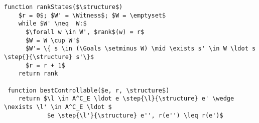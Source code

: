 \begin{lstlisting}[language={pseudocode},label={lst:dcs.aux},caption={ranking procedures.},float=ht, frame=single]
 function rankStates($\structure$)
    $r = 0$; $W' = \Witness$; $W = \emptyset$
    while $W' \neq  W:$
      $\forall w \in W', $rank$(w) = r$
      $W = W \cup W'$
      $W'= \{ s \in (\Goals \setminus W) \mid \exists s' \in W \ldot s \step{}{\structure} s'\}$
      $r = r + 1$
    return rank

 function bestControllable($e, r, \structure$)
    return $\l \in A^C_E \ldot e \step{\l}{\structure} e' \wedge \nexists \l' \in A^C_E \ldot $
			$e \step{\l'}{\structure} e'', r(e'') \leq r(e')$

\end{lstlisting}


%
%
%   

